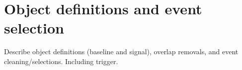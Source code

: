 \section{Object definitions and event selection}
\label{sec:selection}

Describe object definitions (baseline and signal), overlap removals, and event cleaning/selections. Including trigger.

